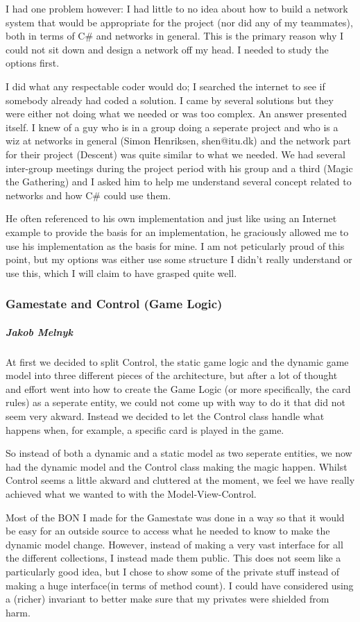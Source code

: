 I had one problem however: I had little to no idea about how to build a network system that would be appropriate for the project (nor did any of my teammates), both in terms of C\# and networks in general. 
This is the primary reason why I could not sit down and design a network off my head. I needed to study the options first.

I did what any respectable coder would do; I searched the internet to see if somebody already had coded a solution. 
I came by several solutions but they were either not doing what we needed or was too complex.
An answer presented itself. I knew of a guy who is in a group doing a seperate project and who is a wiz at networks in general (Simon Henriksen, shen@itu.dk) and the network part for their project (Descent) was quite similar to what we needed. 
We had several inter-group meetings during the project period with his group and a third (Magic the Gathering) and I asked him to help me understand several concept related to networks and how C\# could use them.

He often referenced to his own implementation and just like using an Internet example to provide the basis for an implementation, he graciously allowed me to use his implementation as the basis for mine.
I am not peticularly proud of this point, but my options was either use some structure I didn't really understand or use this, which I will claim to have grasped quite well.

\subsubsection{Gamestate and Control (Game Logic)}
\subparagraph{Jakob Melnyk}
At first we decided to split Control, the static game logic and the dynamic game model into three different pieces of the architecture, but after a lot of thought and effort went into how to create the Game Logic (or more specifically, the card rules) as a seperate entity, we could not come up with way to do it that did not seem very akward. Instead we decided to let the Control class handle what happens when, for example, a specific card is played in the game.

So instead of both a dynamic and a static model as two seperate entities, we now had the dynamic model and the Control class making the magic happen. Whilst Control seems a little akward and cluttered at the moment, we feel we have really achieved what we wanted to with the Model-View-Control.

Most of the BON I made for the Gamestate was done in a way so that it would be easy for an outside source to access what he needed to know to make the dynamic model change. However, instead of making a very vast interface for all the different collections, I instead made them public. This does not seem like a particularly good idea, but I chose to show some of the private stuff instead of making a huge interface(in terms of method count). I could have considered using a (richer) invariant to better make sure that my privates were shielded from harm.

